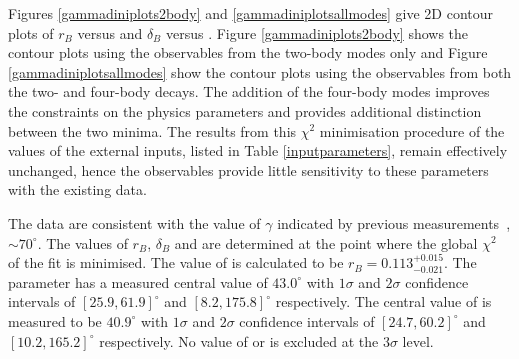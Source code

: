 Figures \ref{gammadiniplots2body} and \ref{gammadiniplotsallmodes} give 2D contour plots of $r_B$ versus \Pgamma and $\delta_B$ versus \Pgamma. Figure \ref{gammadiniplots2body} shows the contour plots using the \CP observables from the two-body modes only and Figure \ref{gammadiniplotsallmodes} show the contour plots using the \CP observables from both the two- and four-body decays. The addition of the four-body modes improves the constraints on the physics parameters and provides additional distinction between the two minima. The results from this $\chi^2$ minimisation procedure of the values of the external inputs, listed in Table \ref{inputparameters}, remain effectively unchanged, hence the \CP observables provide little sensitivity to these parameters with the existing data.

The data are consistent with the value of $\gamma$ indicated by previous measurements~\cite{LHCb-PAPER-2016-032, CKMFitter}, $\sim 70^\circ$. The values of $r_B$, $\delta_B$ and \Pgamma are determined at the point where the global $\chi^2$ of the fit is minimised. The value of \rb is calculated to be $r_B = 0.113^{+0.015}_{-0.021}$. The parameter \deltab has a measured central value of $43.0^{\circ}$ with $1\sigma$ and $2\sigma$ confidence intervals of $[25.9, 61.9]^{\circ}$ and $[8.2, 175.8]^{\circ}$ respectively. The central value of \Pgamma is measured to be $40.9^{\circ}$ with $1\sigma$ and $2\sigma$ confidence intervals of $[24.7, 60.2]^{\circ}$ and $[10.2, 165.2]^{\circ}$ respectively. No value of \Pgamma or \deltab is excluded at the $3\sigma$ level.



